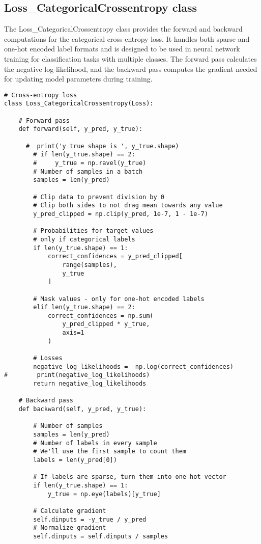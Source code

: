 \documentclass{article}
\begin{document}
\subsection{Loss\_CategoricalCrossentropy class}
The Loss\_CategoricalCrossentropy class provides the forward and backward computations for the categorical cross-entropy loss. It handles both sparse and one-hot encoded label formats and is designed to be used in neural network training for classification tasks with multiple classes. The forward pass calculates the negative log-likelihood, and the backward pass computes the gradient needed for updating model parameters during training.
\begin{lstlisting}
# Cross-entropy loss
class Loss_CategoricalCrossentropy(Loss):

    # Forward pass
    def forward(self, y_pred, y_true):

      #  print('y true shape is ', y_true.shape)
        # if len(y_true.shape) == 2:
        #     y_true = np.ravel(y_true)
        # Number of samples in a batch
        samples = len(y_pred)

        # Clip data to prevent division by 0
        # Clip both sides to not drag mean towards any value
        y_pred_clipped = np.clip(y_pred, 1e-7, 1 - 1e-7)

        # Probabilities for target values -
        # only if categorical labels
        if len(y_true.shape) == 1:
            correct_confidences = y_pred_clipped[
                range(samples),
                y_true
            ]

        # Mask values - only for one-hot encoded labels
        elif len(y_true.shape) == 2:
            correct_confidences = np.sum(
                y_pred_clipped * y_true,
                axis=1
            )

        # Losses
        negative_log_likelihoods = -np.log(correct_confidences)
#        print(negative_log_likelihoods)
        return negative_log_likelihoods

    # Backward pass
    def backward(self, y_pred, y_true):

        # Number of samples
        samples = len(y_pred)
        # Number of labels in every sample
        # We'll use the first sample to count them
        labels = len(y_pred[0])

        # If labels are sparse, turn them into one-hot vector
        if len(y_true.shape) == 1:
            y_true = np.eye(labels)[y_true]

        # Calculate gradient
        self.dinputs = -y_true / y_pred
        # Normalize gradient
        self.dinputs = self.dinputs / samples

\end{lstlisting}
\end{document}
